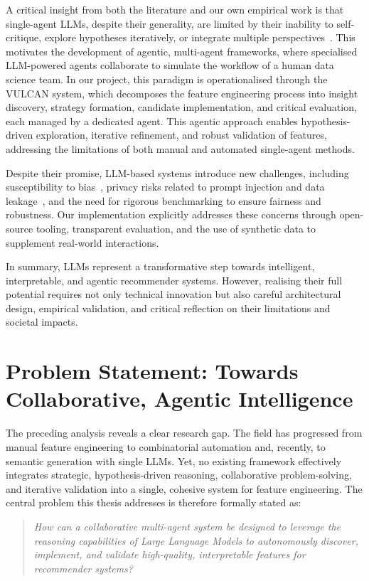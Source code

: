 A critical insight from both the literature and our own empirical work is that single-agent LLMs, despite their generality, are limited by their inability to self-critique, explore hypotheses iteratively, or integrate multiple perspectives~\cite{Zhang2023AgentCF}. This motivates the development of agentic, multi-agent frameworks, where specialised LLM-powered agents collaborate to simulate the workflow of a human data science team. In our project, this paradigm is operationalised through the VULCAN system, which decomposes the feature engineering process into insight discovery, strategy formation, candidate implementation, and critical evaluation, each managed by a dedicated agent. This agentic approach enables hypothesis-driven exploration, iterative refinement, and robust validation of features, addressing the limitations of both manual and automated single-agent methods.

Despite their promise, LLM-based systems introduce new challenges, including susceptibility to bias~\cite{Deldjoo2024Biases}, privacy risks related to prompt injection and data leakage~\cite{Yi2024PromptInjection}, and the need for rigorous benchmarking to ensure fairness and robustness. Our implementation explicitly addresses these concerns through open-source tooling, transparent evaluation, and the use of synthetic data to supplement real-world interactions.

In summary, LLMs represent a transformative step towards intelligent, interpretable, and agentic recommender systems. However, realising their full potential requires not only technical innovation but also careful architectural design, empirical validation, and critical reflection on their limitations and societal impacts.
\section{Problem Statement: Towards Collaborative, Agentic Intelligence}
\label{sec:intro_problem}

The preceding analysis reveals a clear research gap. The field has progressed from manual feature engineering to combinatorial automation and, recently, to semantic generation with single LLMs. Yet, no existing framework effectively integrates strategic, hypothesis-driven reasoning, collaborative problem-solving, and iterative validation into a single, cohesive system for feature engineering. The central problem this thesis addresses is therefore formally stated as:

\blockquote{\itshape
How can a collaborative multi-agent system be designed to leverage the reasoning capabilities of Large Language Models to autonomously discover, implement, and validate high-quality, interpretable features for recommender systems?}

